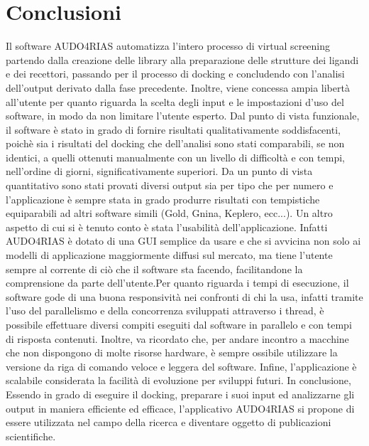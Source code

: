\section*{Conclusioni}
Il software AUDO4RIAS automatizza l’intero processo di virtual screening partendo dalla creazione delle library alla preparazione delle strutture dei ligandi e dei recettori, passando per il processo di docking e concludendo con l’analisi dell’output derivato dalla fase precedente.
Inoltre, viene concessa ampia libertà all’utente per quanto riguarda la scelta degli input e le impostazioni d’uso del software, in modo da non limitare l’utente esperto. Dal punto di vista funzionale, il software è stato in grado di fornire risultati qualitativamente soddisfacenti, poichè sia i risultati del docking che dell’analisi sono stati comparabili, se non identici, a quelli ottenuti manualmente con un livello di difficoltà e con tempi, nell’ordine di giorni, significativamente superiori. Da un punto di vista quantitativo sono stati provati diversi output sia per tipo che per numero e l’applicazione è sempre stata in grado produrre risultati con tempistiche equiparabili ad altri software simili (Gold, Gnina, Keplero, ecc...). Un altro aspetto di cui si è tenuto conto è stata l’usabilità dell’applicazione. Infatti AUDO4RIAS è dotato di una GUI semplice da usare e che si avvicina non solo ai modelli di applicazione maggiormente diffusi sul mercato, ma tiene l’utente sempre al corrente di ciò che il software sta facendo, facilitandone la comprensione da parte dell’utente.Per quanto riguarda i tempi di esecuzione, il software gode di una buona responsività nei confronti di chi la usa, infatti tramite l’uso del parallelismo e della concorrenza sviluppati attraverso i thread, è possibile effettuare diversi compiti eseguiti dal software in parallelo e con tempi di risposta contenuti. Inoltre, va ricordato che, per andare incontro a macchine che non dispongono di molte risorse hardware, è sempre ossibile utilizzare la versione da riga di comando veloce e leggera del software.
Infine, l’applicazione è scalabile considerata la facilità  di evoluzione per sviluppi futuri. In conclusione, Essendo in grado di eseguire il docking, preparare i suoi input ed analizzarne gli output in maniera efficiente ed efficace, l’applicativo AUDO4RIAS si propone di essere utilizzata nel campo della ricerca e diventare oggetto di publicazioni scientifiche.

